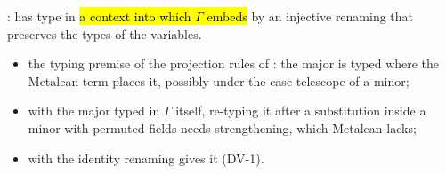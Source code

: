 \begin{definition}
  \label{def:EraseProof-TypedExt}
  \leanok
   :  has type  in \hl{a context
   into which $\Gamma$ embeds} by an injective renaming that preserves the types
  of the variables.
  \begin{itemize}
  \item {} the typing premise of the projection rules of : the major is typed
        where the Metalean term places it, possibly under the case telescope of a minor;
  \item {} with the major typed in $\Gamma$ itself, re-typing it after a substitution
        inside a minor with permuted fields needs strengthening, which Metalean lacks;
  \item {}  with the identity
        renaming gives it (DV-1).
  \end{itemize}
\end{definition}

